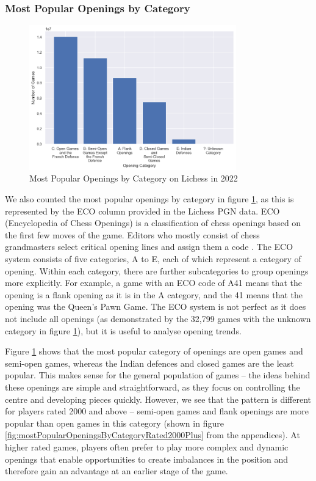 \documentclass[a4paper, 11pt]{article}
\begin{document}
\subsubsection{Most Popular Openings by Category}
\begin{figure}[H]
    \centering
    \caption{Most Popular Openings by Category on Lichess in 2022}
    \label{fig:mostPopularOpeningsByCategory}
    \includegraphics[width=0.8\textwidth]{Most Popular Openings by Category.png}
\end{figure}

We also counted the most popular openings by category in figure \ref{fig:mostPopularOpeningsByCategory}, as this is represented by the ECO column provided in the Lichess PGN data. ECO (Encyclopedia of Chess Openings) is a classification of chess openings based on the first few moves of the game. Editors who mostly consist of chess grandmasters select critical opening lines and assign them a code \cite{matanovic1971classification}. The ECO system consists of five categories, A to E, each of which represent a category of opening. Within each category, there are further subcategories to group openings more explicitly. For example, a game with an ECO code of A41 means that the opening is a flank opening as it is in the A category, and the 41 means that the opening was the Queen's Pawn Game. The ECO system is not perfect as it does not include all openings (as demonstrated by the 32,799 games with the unknown category in figure \ref{fig:mostPopularOpeningsByCategory}), but it is useful to analyse opening trends.

Figure \ref{fig:mostPopularOpeningsByCategory} shows that the most popular category of openings are open games and semi-open games, whereas the Indian defences and closed games are the least popular. This makes sense for the general population of games -- the ideas behind these openings are simple and straightforward, as they focus on controlling the centre and developing pieces quickly. However, we see that the pattern is different for players rated 2000 and above -- semi-open games and flank openings are more popular than open games in this category (shown in figure \ref{fig:mostPopularOpeningsByCategoryRated2000Plus} from the appendices). At higher rated games, players often prefer to play more complex and dynamic openings that enable opportunities to create imbalances in the position and therefore gain an advantage at an earlier stage of the game.
\end{document}
